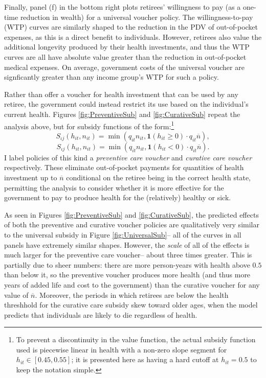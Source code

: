 \documentclass[12pt,pdftex,letterpaper]{article}
\newcommand{\Type}{\iota}
\newcommand{\Health}{h}
\newcommand{\Invst}{n}
\newcommand{\Copay}{q}
\newcommand{\Subsidy}{S}
\newcommand{\Age}{j}
\begin{document}
Finally, panel (f) in the bottom right plots retirees' willingness to pay (as a one-time reduction in wealth) for a universal voucher policy.  The willingness-to-pay (WTP) curves are similarly shaped to the reduction in the PDV of out-of-pocket expenses, as this is a direct benefit to individuals.  However, retirees also value the additional longevity produced by their health investments, and thus the WTP curves are all have absolute value greater than the reduction in out-of-pocket medical expenses.  On average, government costs of the universal voucher are signficantly greater than any income group's WTP for such a policy.

Rather than offer a voucher for health investment that can be used by any retiree, the government could instead restrict its use based on the individual's current health.  Figures \ref{fig:PreventiveSub} and \ref{fig:CurativeSub} repeat the analysis above, but for subsidy functions of the form:\footnote{To prevent a discontinuity in the value function, the actual subsidy function used is piecewise linear in health with a non-zero slope segment for $\Health_{it} \in [0.45,0.55]$; it is presented here as having a hard cutoff at $\Health_{it}=0.5$ to keep the notation simple.}
\begin{equation}
\Subsidy_{\Type \Age}(\Health_{it},\Invst_{it})  = \min(\Copay_{it}\Invst_{it}, \textbf{1}(\Health_{it} \geq 0) \cdot \Copay_{it}\overline{\Invst}),
\end{equation}
\begin{equation}
\Subsidy_{\Type \Age}(\Health_{it},\Invst_{it})  = \min(\Copay_{it}\Invst_{it}, \textbf{1}(\Health_{it} < 0) \cdot \Copay_{it}\overline{\Invst}).
\end{equation}
I label policies of this kind a \textit{preventive care voucher} and \textit{curative care voucher} respectively.  These eliminate out-of-pocket payments for quantities of health investment up to $\overline{\Invst}$ conditional on the retiree being in the correct health state, permitting the analysis to consider whether it is more effective for the government to pay to produce health for the (relatively) healthy or sick.

As seen in Figures \ref{fig:PreventiveSub} and \ref{fig:CurativeSub}, the predicted effects of both the preventive and curative voucher policies are qualitatively very similar to the universal subsidy in Figure \ref{fig:UniversalSub}-- all of the curves in all panels have extremely similar shapes.  However, the \textit{scale} of all of the effects is much larger for the preventive care voucher-- about three times greater.   This is partially due to sheer numbers: there are more person-years with health above $0.5$ than below it, so the preventive voucher produces more health (and thus more years of added life and cost to the government) than the curative voucher for any value of $\overline{\Invst}$.  Moreover, the periods in which retirees are below the health threshhold for the curative care subsidy skew toward older ages, when the model predicts that individuals are likely to die regardless of health.
\end{document}
